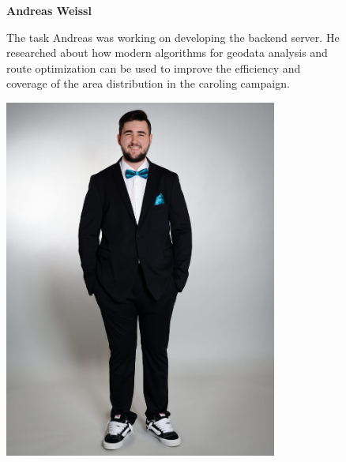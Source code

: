     \begin{figure}[H]
        \centering
        \begin{minipage}{0.6\textwidth}
          \setlength{\baselineskip}{1.5em}
          \vspace{-1em}
          \textbf{Andreas Weissl}

          The task Andreas was working on developing the backend server. He researched about how modern algorithms for geodata analysis and route optimization can be used to improve the efficiency and coverage of the area distribution in the caroling campaign.
        \end{minipage}
        \hfill
        \begin{minipage}{0.35\textwidth}
            \center
            \includegraphics[width=0.8\textwidth]{images/people/andreasWeissl.jpeg}
    \end{minipage}
    \end{figure}

\newpage